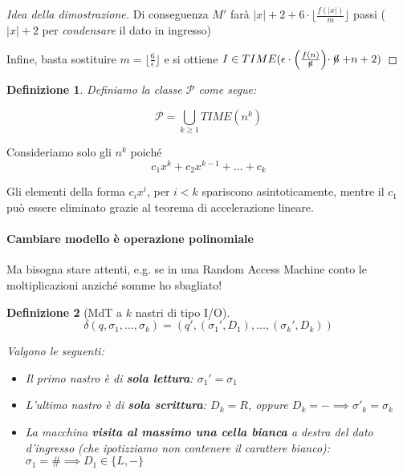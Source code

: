 \documentclass[a4paper,10pt,oneside]{article}
\theoremstyle{break}
\newtheorem{deff}{Definizione}[section]
\begin{document}
\begin{mdframed}
\begin{proof}[Idea della dimostrazione]
 Di conseguenza $M'$ farà $|x| + 2 + 6 \cdot \Big\lfloor \frac{f(|x|)}{m} \Big\rfloor$ passi ($|x| + 2$ per \textit{condensare} il dato in ingresso)

 Infine, basta sostituire $m = \Big\lfloor \frac{6}{\epsilon} \Big\rfloor$ e si ottiene $I \in TIME(\epsilon \cdot \Big(\frac{f(n)}{\centernot 6}\Big)\cdot \centernot6 + n + 2)$
 \end{proof}

\end{mdframed}

 \begin{deff}
  Definiamo la classe $\mathcal P$ come segue:

  \[\mathcal P = \bigcup_{k \geq 1} TIME (n^k)\]
 \end{deff}

Consideriamo solo gli $n^k$ poiché
\[c_1 x^k + c_2x^{k-1} + \hdots + c_k\]

Gli elementi della forma $c_i x^i$, per $i < k$ spariscono asintoticamente, mentre il $c_1$ può essere eliminato grazie al teorema di accelerazione lineare.

\paragraph{Cambiare modello è operazione polinomiale} Ma bisogna stare attenti, e.g. se in una Random Access Machine conto le moltiplicazioni anziché somme ho sbagliato!

\begin{deff}
 [MdT a $k$ nastri di tipo I/O]

 \[ \delta(q, \sigma_1, \hdots, \sigma_k) = (q', (\sigma_1', D_1), \hdots, (\sigma_k', D_k)) \]

 Valgono le seguenti:
 \begin{itemize}
  \item Il primo nastro è di \textbf{sola lettura}: $\sigma_1' = \sigma_1$
  \item L'ultimo nastro è di \textbf{sola scrittura}: $D_k = R$, oppure $D_k = - \implies \sigma'_k=\sigma_k$
  \item La macchina \textbf{visita al massimo una cella bianca} a destra del dato d'ingresso (che ipotizziamo non contenere il carattere bianco): $\sigma_1 = \# \implies D_1 \in \{L, -\}$
 \end{itemize}


\end{deff}

\newpage
\end{document}

